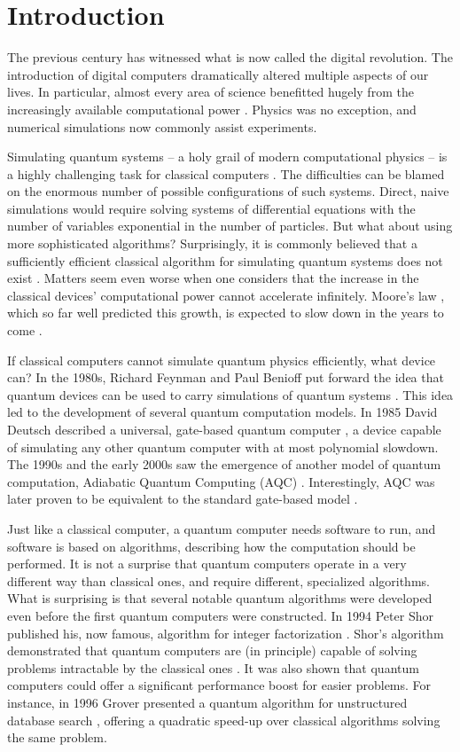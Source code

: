 \chapter{Introduction}
The previous century has witnessed what is now called the digital revolution.
The introduction of digital computers dramatically altered multiple aspects of
our lives. In particular, almost every area of science benefitted hugely from
the increasingly available computational power \cite{winsberg}. Physics was no
exception, and numerical simulations now commonly assist experiments.

Simulating quantum systems -- a holy grail of modern computational physics --
is a highly challenging task for classical computers \cite{feynman.82}. The
difficulties can be blamed on the enormous number of possible configurations of
such systems. Direct, naive simulations would require solving systems of
differential equations with the number of variables exponential in the number
of particles. But what about using more sophisticated algorithms? Surprisingly,
it is commonly believed that a sufficiently efficient classical algorithm for
simulating quantum systems does not exist \cite{feynman.82, poplavskii}.
Matters seem even worse when one considers that the increase in the classical
devices' computational power cannot accelerate infinitely. Moore's law
\cite{mack}, which so far well predicted this growth, is expected to slow down
in the years to come \cite{waldrop, kumar}.

If classical computers cannot simulate quantum physics efficiently, what device
can? In the 1980s, Richard Feynman and Paul Benioff put forward the idea that
quantum devices can be used to carry simulations of quantum systems
\cite{feynman.82,benioff.80}. This idea led to the development of several
quantum computation models. In 1985 David Deutsch described a universal,
gate-based quantum computer \cite{deutsch}, a device capable of simulating any
other quantum computer with at most polynomial slowdown. The 1990s and the
early 2000s saw the emergence of another model of quantum computation,
Adiabatic Quantum Computing (AQC) \cite{kadowaki,farhi}. Interestingly, AQC was
later proven to be equivalent to the standard gate-based model \cite{aharonov}.

Just like a classical computer, a quantum computer needs software to run, and
software is based on algorithms, describing how the computation should be
performed. It is not a surprise that quantum computers operate in a very
different way than classical ones, and require different, specialized
algorithms. What is surprising is that several notable quantum algorithms were
developed even before the first quantum computers were constructed. In 1994
Peter Shor published his, now famous, algorithm for integer factorization
\cite{shor}. Shor's algorithm demonstrated that quantum computers are (in
principle) capable of solving problems intractable by the classical ones
\cite{kleinjung}. It was also shown that quantum computers could offer a
significant performance boost for easier problems. For instance, in 1996 Grover
presented a quantum algorithm for unstructured database search \cite{grover},
offering a quadratic speed-up over classical algorithms solving the same problem.

